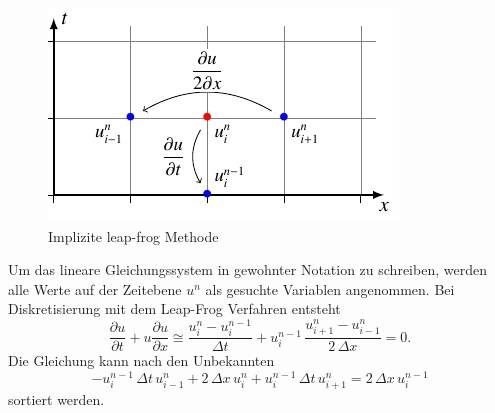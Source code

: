 	    \begin{figure}
		\centering
		\includegraphics[height=.4\textwidth]{papers/burgers/BurgersEquation/tikz/implicit/implicit.pdf}
		\caption{Implizite leap-frog Methode}
		\label{burgers:fig:Implicit}
	\end{figure}
	Um das lineare Gleichungssystem in gewohnter Notation zu schreiben, werden alle Werte auf der Zeitebene $u^n$ als gesuchte Variablen angenommen.
	Bei Diskretisierung mit dem Leap-Frog Verfahren entsteht
	\begin{equation}
	\frac {\partial u}{\partial t}+u{\frac {\partial u}{\partial x}} \cong \frac{u_{i}^{n}-u_{i}^{n-1}}{\Delta t}+ u_{i}^{n-1}\, \frac{u_{i+1}^{n}-u_{i-1}^{n}}{2\,\Delta x}=0.
	\end{equation}
	Die Gleichung kann nach den Unbekannten
	\begin{equation}
	   -u_{i}^{n-1} \, \Delta t \, u_{i-1}^{n} +  2 \, \Delta x \,  u_{i}^{n} + u_{i}^{n-1} \, \Delta t \, u_{i+1}^{n} =  2 \, \Delta x \, u_{i}^{n-1}
	\end{equation}
	sortiert werden.


